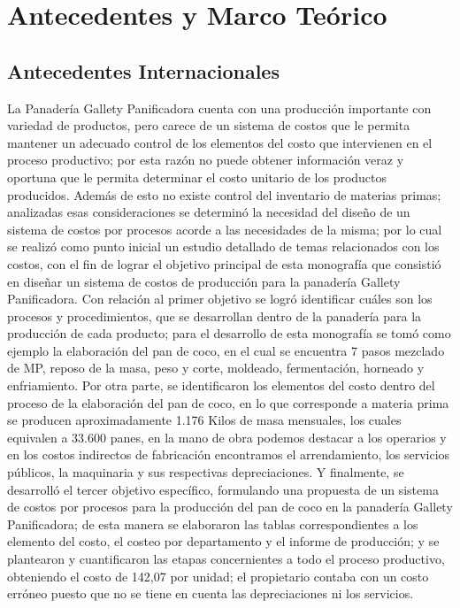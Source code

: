 \documentclass[conference]{IEEEtran}
\begin{document}
\section{Antecedentes y Marco Teórico}

\subsection{Antecedentes Internacionales}
La Panadería Gallety Panificadora cuenta con una producción importante con variedad de productos, pero carece de un sistema de costos que le permita mantener un adecuado control de los elementos del costo que intervienen en el proceso productivo; por esta razón no puede obtener información veraz y oportuna que le permita determinar el costo unitario de los productos producidos. Además de esto no existe control del inventario de materias primas; analizadas esas consideraciones se determinó la necesidad del diseño de un sistema de costos por procesos acorde a las necesidades de la misma; por lo cual se realizó como punto inicial un estudio detallado de temas relacionados con los costos, con el fin de lograr el objetivo principal de esta monografía que consistió en diseñar un sistema de costos de producción para la panadería Gallety Panificadora. Con relación al primer objetivo se logró identificar cuáles son los procesos y procedimientos, que se desarrollan dentro de la panadería para la producción de cada producto; para el desarrollo de esta monografía se tomó como ejemplo la elaboración del pan de coco, en el cual se encuentra 7 pasos mezclado de MP, reposo de la masa, peso y corte, moldeado, fermentación, horneado y enfriamiento. Por otra parte, se identificaron los elementos del costo dentro del proceso de la elaboración del pan de coco, en lo que corresponde a materia prima se producen aproximadamente 1.176 Kilos de masa mensuales, los cuales equivalen a 33.600 panes, en la mano de obra podemos destacar a los operarios y en los costos indirectos de fabricación encontramos el arrendamiento, los servicios públicos, la maquinaria y sus respectivas depreciaciones. Y finalmente, se desarrolló el tercer objetivo específico, formulando una propuesta de un sistema de costos por procesos para la producción del pan de coco en la panadería Gallety Panificadora; de esta manera se elaboraron las tablas correspondientes a los elemento del costo, el costeo por departamento y el informe de producción; y se plantearon y cuantificaron las etapas concernientes a todo el proceso productivo, obteniendo el costo de 142,07 por unidad; el propietario contaba con un costo erróneo puesto que no se tiene en cuenta las depreciaciones ni los servicios.
\end{document}
